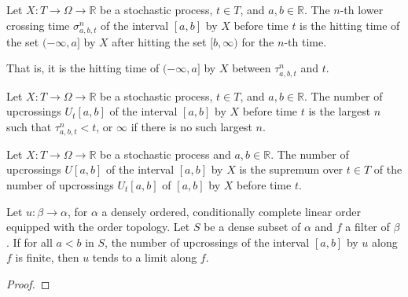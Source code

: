 \begin{definition}\label{def:lowerCrossingTime}
  \mathlibok
Let $X : T \to \Omega \to \mathbb{R}$ be a stochastic process, $t \in T$, and $a, b \in \mathbb{R}$.
The $n$-th lower crossing time $\sigma^n_{a, b, t}$ of the interval $[a, b]$ by $X$ before time $t$ is the hitting time of the set $(-\infty, a]$ by $X$ after hitting the set $[b, \infty)$ for the $n$-th time.

That is, it is the hitting time of $(-\infty, a]$ by $X$ between $\tau^n_{a, b, t}$ and $t$.
\end{definition}


\begin{definition}\label{def:upcrossingsBefore}
  \mathlibok
Let $X : T \to \Omega \to \mathbb{R}$ be a stochastic process, $t \in T$, and $a, b \in \mathbb{R}$.
The number of upcrossings $U_t[a, b]$ of the interval $[a, b]$ by $X$ before time $t$ is the largest $n$ such that $\tau^n_{a, b, t} < t$, or $\infty$ if there is no such largest $n$.
\end{definition}


\begin{definition}[Upcrossings]\label{def:upcrossings}
  \mathlibok
Let $X : T \to \Omega \to \mathbb{R}$ be a stochastic process and $a, b \in \mathbb{R}$.
The number of upcrossings $U[a, b]$ of the interval $[a, b]$ by $X$ is the supremum over $t \in T$ of the number of upcrossings $U_t[a, b]$ of $[a, b]$ by $X$ before time $t$.
\end{definition}


\begin{lemma}\label{lem:tendsto_of_no_upcrossings}
  \mathlibok
Let $u : \beta \to \alpha$, for $\alpha$ a densely ordered, conditionally complete linear order equipped with the order topology.
Let $S$ be a dense subset of $\alpha$ and $f$ a filter of $\beta$.
If for all $a < b$ in $S$, the number of upcrossings of the interval $[a, b]$ by $u$ along $f$ is finite, then $u$ tends to a limit along $f$.
\end{lemma}

\begin{proof}
\end{proof}


